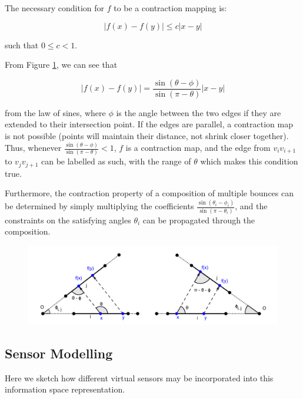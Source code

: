 \documentclass[]{styles/svproc}  %
\begin{document}
The necessary condition for $f$ to be a contraction mapping is:

\begin{equation*}
|f(x) - f(y)| \leq c |x-y|
\end{equation*}

such that $0 \leq c < 1$.

From Figure \ref{fig:cont_map}, we can see that

\begin{equation*}
|f(x) - f(y)| = \frac{\sin(\theta - \phi)}{\sin(\pi-\theta)} |x-y|
\end{equation*}

from the law of sines, where $\phi$ is the angle between the two edges if they
are extended to their intersection point. If the edges are parallel, a
contraction map is not possible (points will maintain their distance, not shrink
closer together). Thus, whenever $\frac{\sin(\theta - \phi)}{\sin(\pi-\theta)}
< 1$, $f$ is a contraction map, and the edge from $v_i v_{i+1}$ to $v_j
v_{j+1}$ can be labelled as such, with the range of $\theta$ which makes this
condition true.

Furthermore, the contraction property of a composition of multiple bounces can
be determined by simply multiplying the coefficients $\frac{\sin(\theta_i -
\phi_i)}{\sin(\pi-\theta_i)}$, and the constraints on the satisfying angles
$\theta_i$ can be propagated through the composition.

\begin{figure}
    \includegraphics[width=0.8\linewidth]{figures/contraction_map_cond.png}
    \centering
    \caption{\label{fig:cont_map}}
\end{figure}

\subsection{Sensor Modelling}

Here we sketch how different virtual sensors may be incorporated into this
information space representation.
\end{document}
